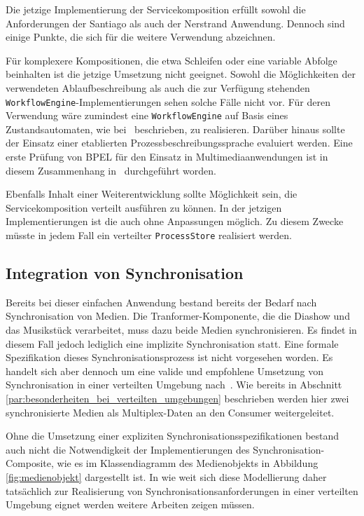   Die jetzige Implementierung der Servicekomposition erfüllt sowohl die Anforderungen der Santiago als auch der Nerstrand Anwendung. Dennoch sind einige Punkte, die sich für die weitere Verwendung abzeichnen.
  
  Für komplexere Kompositionen, die etwa Schleifen oder eine variable Abfolge beinhalten ist die jetzige Umsetzung nicht geeignet. Sowohl die Möglichkeiten der verwendeten Ablaufbeschreibung als auch die zur Verfügung stehenden \verb!WorkflowEngine!-Implementierungen sehen solche Fälle nicht vor. Für deren Verwendung wäre zumindest eine \verb!WorkflowEngine! auf Basis eines Zustandsautomaten, wie bei~\citep{biornstad2006cfs} beschrieben, zu realisieren. Darüber hinaus sollte der Einsatz einer etablierten Prozessbeschreibungssprache evaluiert werden. Eine erste Prüfung von BPEL für den Einsatz in Multimediaanwendungen ist in diesem Zusammenhang in~\citep{samma08} durchgeführt worden.

  Ebenfalls Inhalt einer Weiterentwicklung sollte Möglichkeit sein, die Servicekomposition verteilt ausführen zu können. In der jetzigen Implementierungen ist die auch ohne Anpassungen möglich. Zu diesem Zwecke müsste in jedem Fall ein verteilter \verb!ProcessStore! realisiert werden.


\subsection{Integration von Synchronisation} %
\label{sub:integration_von_synchronisation}

  Bereits bei dieser einfachen Anwendung bestand bereits der Bedarf nach Synchronisation von Medien. Die Tranformer-Komponente, die die Diashow und das Musikstück verarbeitet, muss dazu beide Medien synchronisieren. Es findet in diesem Fall jedoch lediglich eine implizite Synchronisation statt. Eine formale Spezifikation dieses Synchronisationsprozess ist nicht vorgesehen worden. Es handelt sich aber dennoch um eine valide und empfohlene Umsetzung von Synchronisation in einer verteilten Umgebung nach~\citep[S. 609]{multimedia_technologie}. Wie bereits in Abschnitt \ref{par:besonderheiten_bei_verteilten_umgebungen} beschrieben werden hier zwei synchronisierte Medien als Multiplex-Daten an den Consumer weitergeleitet.
  
  Ohne die Umsetzung einer expliziten Synchronisationsspezifikationen bestand auch nicht die Notwendigkeit der Implementierungen des Synchronisation-Composite, wie es im Klassendiagramm des Medienobjekts in Abbildung \ref{fig:medienobjekt} dargestellt ist. In wie weit sich diese Modellierung daher tatsächlich zur Realisierung von Synchronisationsanforderungen in einer verteilten Umgebung eignet werden weitere Arbeiten zeigen müssen.

